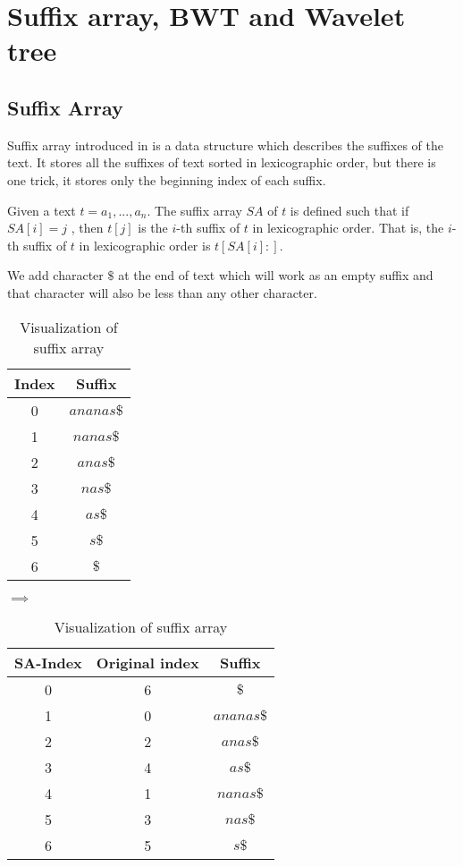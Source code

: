 \section{Suffix array, BWT and Wavelet tree}
\subsection{Suffix Array}
Suffix array introduced in \cite{SuffixArray} is a data structure which describes the suffixes of the text. It stores all the suffixes of text sorted in lexicographic order, but there is one trick, it stores only the beginning index of each suffix.

\begin{definition}\cite[p. 986]{cormenSufixArray}
    Given a text $t = a_1,...,a_n$. The suffix array $SA$ of $t$ is defined such that if $SA[i] = j$ , then $t[j]$ is the $i$-th suffix of $t$ in lexicographic order. That is, the $i$-th suffix of $t$ in lexicographic order is $t[SA[i]:]$.
\end{definition}

We add character $\$$ at the end of text which will work as an empty suffix and that character will also be less than any other character.

\begin{table}[H]
\caption*{Visualization of suffix array}
\begin{center}
\begin{tabular}{|c|c|}
\hline
\rowcolor[HTML]{C0C0C0} 
Index & Suffix   \\ \hline
0     & $ananas\$$ \\ \hline
1     & $nanas\$$  \\ \hline
2     & $anas\$$   \\ \hline
3     & $nas\$$    \\ \hline
4     & $as\$$     \\ \hline
5     & $s\$$      \\ \hline
6     & $\$$       \\ \hline
\end{tabular}
$\implies$
\begin{tabular}{|c|c|c|}
\hline
\rowcolor[HTML]{C0C0C0} 
SA-Index & Original index & Suffix   \\ \hline
0        & 6              & $\$$       \\ \hline
1        & 0              & $ananas\$$ \\ \hline
2        & 2              & $anas\$$   \\ \hline
3        & 4              & $as\$$     \\ \hline
4        & 1              & $nanas\$$  \\ \hline
5        & 3              & $nas\$$    \\ \hline
6        & 5              & $s\$$      \\ \hline
\end{tabular}
\end{center}
\end{table}

